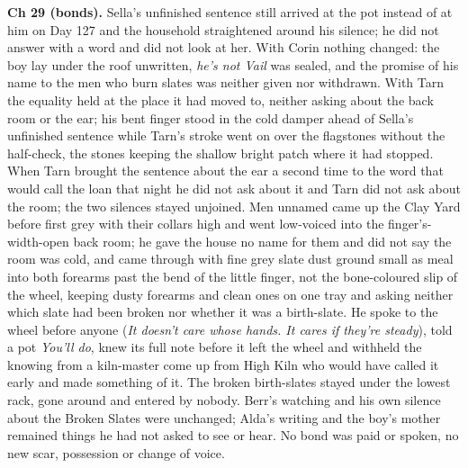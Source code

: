 \documentclass{design/chronicle}
\begin{document}
{\textbf{Ch 29 (bonds).} Sella’s unfinished sentence still arrived at the pot instead of at him on Day 127 and the household straightened around his silence; he did not answer with a word and did not look at her. With Corin nothing changed: the boy lay under the roof unwritten, \emph{he’s not Vail} was sealed, and the promise of his name to the men who burn slates was neither given nor withdrawn. With Tarn the equality held at the place it had moved to, neither asking about the back room or the ear; his bent finger stood in the cold damper ahead of Sella’s unfinished sentence while Tarn’s stroke went on over the flagstones without the half-check, the stones keeping the shallow bright patch where it had stopped. When Tarn brought the sentence about the ear a second time to the word that would call the loan that night he did not ask about it and Tarn did not ask about the room; the two silences stayed unjoined. Men unnamed came up the Clay Yard before first grey with their collars high and went low-voiced into the finger’s-width-open back room; he gave the house no name for them and did not say the room was cold, and came through with fine grey slate dust ground small as meal into both forearms past the bend of the little finger, not the bone-coloured slip of the wheel, keeping dusty forearms and clean ones on one tray and asking neither which slate had been broken nor whether it was a birth-slate. He spoke to the wheel before anyone (\emph{It doesn’t care whose hands. It cares if they’re steady}), told a pot \emph{You’ll do}, knew its full note before it left the wheel and withheld the knowing from a kiln-master come up from High Kiln who would have called it early and made something of it. The broken birth-slates stayed under the lowest rack, gone around and entered by nobody. Berr’s watching and his own silence about the Broken Slates were unchanged; Alda’s writing and the boy’s mother remained things he had not asked to see or hear. No bond was paid or spoken, no new scar, possession or change of voice.

}
\end{document}
